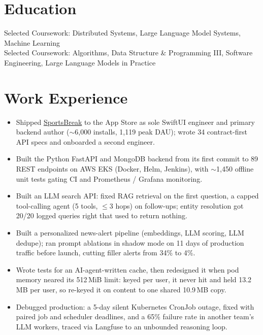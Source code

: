 \documentclass[11pt, letterpaper]{article}
\begin{document}

\section{Education}
Selected Coursework: Distributed Systems, Large Language Model Systems, Machine Learning\\[1pt]
Selected Coursework: Algorithms, Data Structure \& Programming III, Software Engineering, Large Language Models in Practice

\section{Work Experience}
\begin{itemize}
  \item Shipped \href{https://apps.apple.com/app/id6762649287}{SportsBreak} to the App Store as sole SwiftUI engineer and primary backend author ($\sim$6{,}000 installs, 1{,}119 peak DAU); wrote 34 contract-first API specs and onboarded a second engineer.
  \item Built the Python FastAPI and MongoDB backend from its first commit to 89 REST endpoints on AWS EKS (Docker, Helm, Jenkins), with $\sim$1{,}450 offline unit tests gating CI and Prometheus / Grafana monitoring.
  \item Built an LLM search API: fixed RAG retrieval on the first question, a capped tool-calling agent (5 tools, $\le$3 hops) on follow-ups; entity resolution got 20/20 logged queries right that used to return nothing.
  \item Built a personalized news-alert pipeline (embeddings, LLM scoring, LLM dedupe); ran prompt ablations in shadow mode on 11 days of production traffic before launch, cutting filler alerts from 34\% to 4\%.
  \item Wrote tests for an AI-agent-written cache, then redesigned it when pod memory neared its 512\,MiB limit: keyed per user, it never hit and held 13.2\,MB per user, so re-keyed it on content to one shared 10.9\,MB copy.
  \item Debugged production: a 5-day silent Kubernetes CronJob outage, fixed with paired job and scheduler deadlines, and a 65\% failure rate in another team's LLM workers, traced via Langfuse to an unbounded reasoning loop.
\end{itemize}
\end{document}
